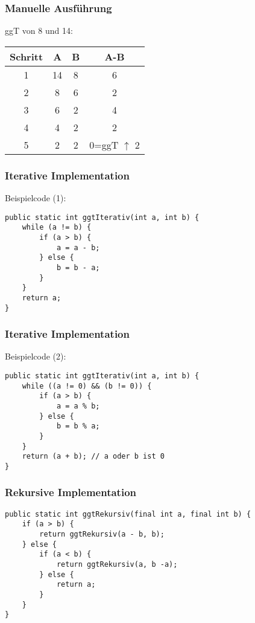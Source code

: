 \subsubsection{Manuelle Ausführung}
ggT von 8 und 14:\\
\begin{tabular}{|c|c|c|c|}
    \hline
        Schritt&A&B&A-B\\
        \hline
        1&14&8&6\\
        2&8&6&2\\
        3&6&2&4\\
        4&4&2&\cellcolor{background}2\\
        5&2&2&0=ggT $\uparrow$ 2\\
    \hline
\end{tabular}

\subsubsection{Iterative Implementation}
Beispielcode (1):\\
\lstset{language=Java}
\begin{lstlisting}
public static int ggtIterativ(int a, int b) {
    while (a != b) {
        if (a > b) {
            a = a - b;
        } else {
            b = b - a;
        }
    }
    return a;
}
\end{lstlisting}

\subsubsection{Iterative Implementation}
Beispielcode (2):\\
\lstset{language=Java}
\begin{lstlisting}
public static int ggtIterativ(int a, int b) {
    while ((a != 0) && (b != 0)) {
        if (a > b) {
            a = a % b;
        } else {
            b = b % a;
        }
    }
    return (a + b); // a oder b ist 0
}
\end{lstlisting}

\subsubsection{Rekursive Implementation}
\lstset{language=Java}
\begin{lstlisting}
public static int ggtRekursiv(final int a, final int b) {
    if (a > b) {
        return ggtRekursiv(a - b, b);
    } else {
        if (a < b) {
            return ggtRekursiv(a, b -a);
        } else {
            return a;
        }
    }
}
\end{lstlisting}

